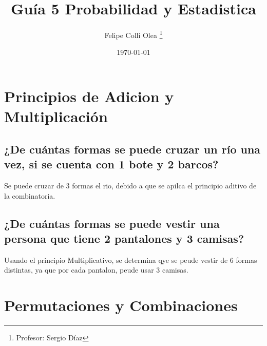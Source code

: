 \documentclass[11pt]{article}
\title{Guía 5 Probabilidad y Estadistica}
\author{Felipe Colli Olea \thanks{Profesor: Sergio Díaz}}
\date{\today}
\begin{document}
\maketitle
\tableofcontents
\newpage

\section{Principios de Adicion y Multiplicación}
    \subsection*{¿De cuántas formas se puede cruzar un río una vez, si se cuenta con 1 bote y 2 barcos?}
    Se puede cruzar de 3 formas el rio, debido a que se apilca el principio aditivo de la combinatoria.

    \subsection*{¿De cuántas formas se puede vestir una persona que tiene 2 pantalones y 3 camisas?}
    Usando el principio Multiplicativo, se determina qye se peude vestir de 6 formas distintas, ya que por cada pantalon, peude usar 3 camisas.

    \subsection*{}


    \newpage

\section{Permutaciones y Combinaciones}
\end{document}
